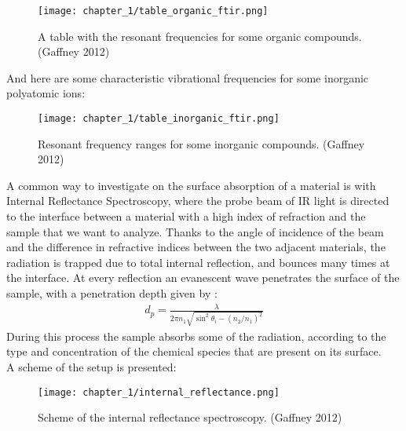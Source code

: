 \begin{figure}[H]
    \centering
    \texttt{[image: chapter\_1/table\_organic\_ftir.png]}
    \vspace*{-20pt}
    \caption{A table with the resonant frequencies for some organic compounds. (Gaffney 2012)}
    \label{fig:table_organic}
\end{figure}
And here are some characteristic vibrational frequencies for some inorganic polyatomic ions:
\begin{figure}[H]
    \centering
    \texttt{[image: chapter\_1/table\_inorganic\_ftir.png]}
    \vspace*{-10pt}
    \caption{Resonant frequency ranges for some inorganic compounds. (Gaffney 2012)}
    \label{fig:table_inorganic}
\end{figure}
A common way to investigate on the surface absorption of a material is with Internal Reflectance Spectroscopy, where the probe beam of IR light is directed to the interface between a material with a high index of refraction and the sample that we want to analyze. Thanks to the angle of incidence of the beam and the difference in refractive indices between the two adjacent materials, the radiation is trapped due to total internal reflection, and bounces many times at the interface. At every reflection an evanescent wave penetrates the surface of the sample, with a penetration depth given by \cite{averettEffectivePathLength2008}:
\begin{align}
    d_p=\frac{\lambda}{2\pi n_1\sqrt{\sin^2{\theta_i}-\left(n_2/n_1\right)^2}} \label{eq:pen_depth_wave}
\end{align}
During this process the sample absorbs some of the radiation, according to the type and concentration of the chemical species that are present on its surface.
\\
A scheme of the setup is presented: 

\begin{figure}[H]
    \centering
    \texttt{[image: chapter\_1/internal\_reflectance.png]}
    \vspace*{10pt}
    \caption{Scheme of the internal reflectance spectroscopy. (Gaffney 2012)}
    \label{fig:internal_reflectance}
\end{figure}

